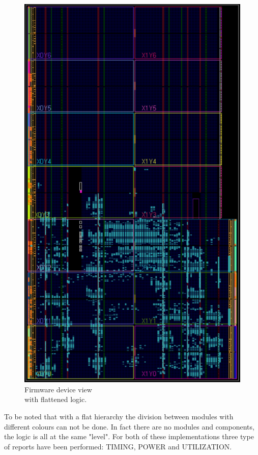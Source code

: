 \begin{figure}[H]
\begin{minipage}{.5\textwidth}
		\includegraphics[width=.85\linewidth]{IMG/ch4/FirmwareFLAT/DEVICE}
		\caption{Firmware device view \\with flattened logic.}
		\label{fig:flatdevice}
	\end{minipage}
\end{figure}
\noindent To be noted that with a flat hierarchy the division between modules with different colours can not be done. In fact there are no modules and components, the logic is all at the same "level".
For both of these implementations three type of reports have been performed: TIMING, POWER and UTILIZATION.

